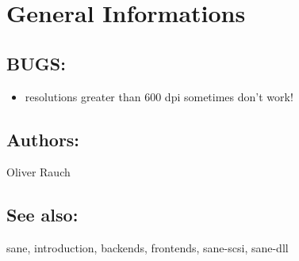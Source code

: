 \newpage
\section{General Informations}


\subsection{BUGS:}

\begin{itemize}
\item resolutions greater than 600 dpi sometimes don't work! 
\end{itemize}


\subsection{Authors:}

Oliver Rauch


\subsection{See also:}

sane, introduction, backends, frontends, sane-scsi, sane-dll




